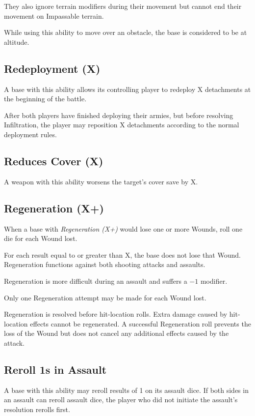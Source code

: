 They also ignore terrain modifiers during their movement but cannot end their movement on Impassable terrain.

While using this ability to move over an obstacle, the base is considered to be at altitude.

\subsection{Redeployment (X)}

A base with this ability allows its controlling player to redeploy X detachments at the beginning of the battle.

After both players have finished deploying their armies, but before resolving Infiltration, the player may reposition X detachments according to the normal deployment rules.

\subsection{Reduces Cover (X)}

A weapon with this ability worsens the target's cover save by X.

\subsection{Regeneration (X+)}

When a base with \textit{Regeneration (X+)} would lose one or more Wounds, roll one die for each Wound lost.

For each result equal to or greater than X, the base does not lose that Wound. Regeneration functions against both shooting attacks and assaults.

Regeneration is more difficult during an assault and suffers a $-1$ modifier.

Only one Regeneration attempt may be made for each Wound lost.

Regeneration is resolved before hit-location rolls. Extra damage caused by hit-location effects cannot be regenerated. A successful Regeneration roll prevents the loss of the Wound but does not cancel any additional effects caused by the attack.

\subsection{Reroll 1s in Assault}

A base with this ability may reroll results of 1 on its assault dice. If both sides in an assault can reroll assault dice, the player who did not initiate the assault's resolution rerolls first.

